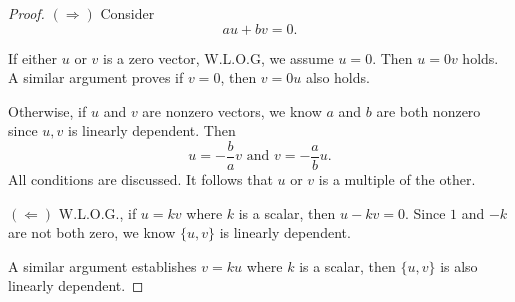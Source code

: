 \begin{Exercise}
	\begin{proof}
		$(\Longrightarrow)$
		Consider
		$$
		a u+b v = 0.
		$$
		
		If either $u$ or $v$ is a zero vector, W.L.O.G, we assume $u=0$. Then $u = 0v$ holds. A similar argument proves if $v=0$, then $v = 0u$ also holds.
		
		Otherwise, if $u$ and $v$ are nonzero vectors, we know $a$ and $b$ are both nonzero since ${u,v}$ is linearly dependent. Then
		$$
		u=-\frac{b}{a}v \text{ and } v=-\frac{a}{b}u.
		$$
		All conditions are discussed. It follows that $u$ or $v$ is a multiple of the other.
		
		\vspace{2ex}
		
		$(\Longleftarrow)$
		W.L.O.G., if $u=k v$ where $k$ is a scalar, then $u-k v=0$. Since $1$ and $-k$ are not both zero, we know $\{u,v\}$ is linearly dependent.
		
		A similar argument establishes $v=k u$ where $k$ is a scalar, then $\{u,v\}$ is also linearly dependent.
	\end{proof}
\end{Exercise}